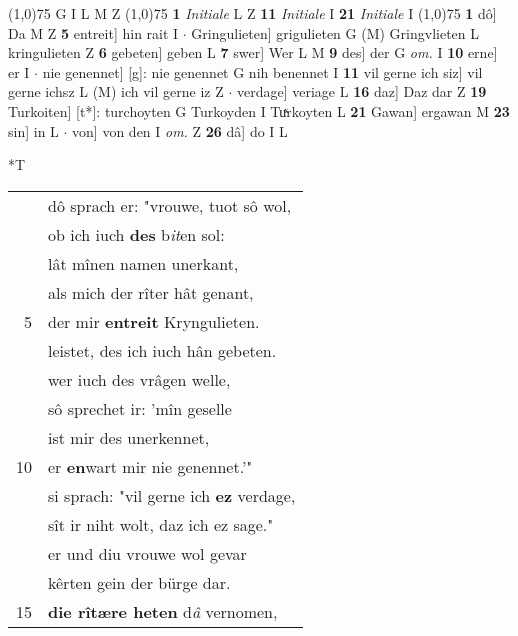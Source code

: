 \documentclass[8pt,a4paper,notitlepage]{article}
\begin{document}
\begin{table}[ht]
\begin{minipage}[t]{0.5\linewidth}
\scriptsize
\line(1,0){75} \newline
G I L M Z \newline
\line(1,0){75} \newline
\textbf{1} \textit{Initiale} L Z  \textbf{11} \textit{Initiale} I  \textbf{21} \textit{Initiale} I  \newline
\line(1,0){75} \newline
\textbf{1} dô] Da M Z \textbf{5} entreit] hin rait I  $\cdot$ Gringulieten] grigulieten G (M) Gringvlieten L kringulieten Z \textbf{6} gebeten] geben L \textbf{7} swer] Wer L M \textbf{9} des] der G \textit{om.} I \textbf{10} erne] er I  $\cdot$ nie genennet] [g]: nie genennet G nih benennet I \textbf{11} vil gerne ich siz] vil gerne ichsz L (M) ich vil gerne iz Z  $\cdot$ verdage] veriage L \textbf{16} daz] Daz dar Z \textbf{19} Turkoiten] [t*]: turchoyten G Turkoyden I Tuͯrkoyten L \textbf{21} Gawan] ergawan M \textbf{23} sin] in L  $\cdot$ von] von den I \textit{om.} Z \textbf{26} dâ] do I L \newline
\end{minipage}
\hspace{0.5cm}
\begin{minipage}[t]{0.5\linewidth}
\small
\begin{center}*T
\end{center}
\begin{tabular}{rl}
 & dô sprach er: "vrouwe, tuot sô wol,\\ 
 & ob ich iuch \textbf{des} b\textit{it}en sol:\\ 
 & lât mînen namen unerkant,\\ 
 & als mich der rîter hât genant,\\ 
5 & der mir \textbf{entreit} Kryngulieten.\\ 
 & leistet, des ich iuch hân gebeten.\\ 
 & wer iuch des vrâgen welle,\\ 
 & sô sprechet ir: 'mîn geselle\\ 
 & ist mir des unerkennet,\\ 
10 & er \textbf{en}wart mir nie genennet.'"\\ 
 & si sprach: "vil gerne ich \textbf{ez} verdage,\\ 
 & sît ir niht wolt, daz ich ez sage."\\ 
 & er und diu vrouwe wol gevar\\ 
 & kêrten gein der bürge dar.\\ 
15 & \textbf{die rîtære heten} d\textit{â} vernomen,\\ 

\end{tabular}
\end{minipage}
\end{table}
\end{document}
